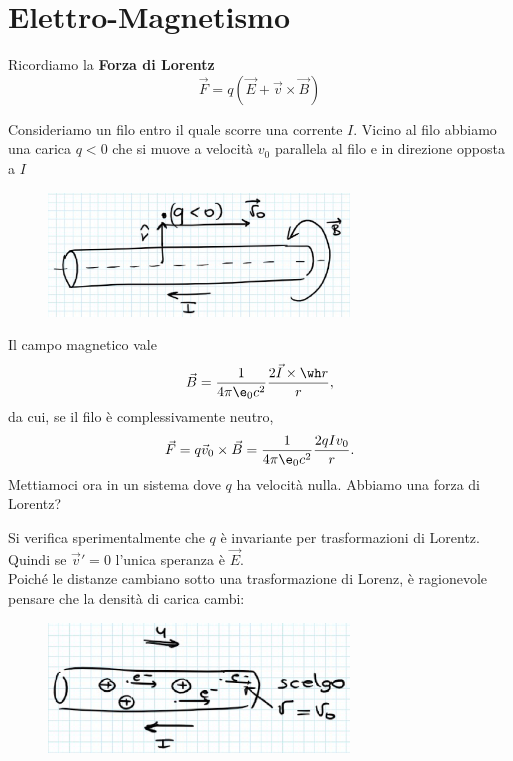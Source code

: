 \section{Elettro-Magnetismo}
Ricordiamo la \textbf{Forza di Lorentz}
\[\vec F=q(\vec E+\vec v\times \vec B)\]

\begin{example}
Consideriamo un filo entro il quale scorre una corrente $I$. Vicino al filo abbiamo una carica $q<0$ che si muove a velocit\`a $v_0$ parallela al filo e in direzione opposta a $I$

\begin{figure}[!htb]
    \centering
    \includegraphics[width=8cm]{images/Filo_e_carica.png}
\end{figure}

\noindent
Il campo magnetico vale
\[\vec B=\frac1{4\pi \e_0c^2}\frac{2 \vec I\times \wh r}r,\]
da cui, se il filo \`e complessivamente neutro,
\[\vec F=q\vec v_0\times \vec B=\frac1{4\pi \e_0c^2}\frac{2 qIv_0}r.\]
Mettiamoci ora in un sistema dove $q$ ha velocit\`a nulla. Abbiamo una forza di Lorentz?
\medskip

\noindent Si verifica sperimentalmente che $q$ \`e invariante per trasformazioni di Lorentz. Quindi se $\vec v'=0$ l'unica speranza \`e $\vec E$.\\
Poich\'e le distanze cambiano sotto una trasformazione di Lorenz, \`e ragionevole pensare che la densit\`a di carica cambi: 

\begin{figure}[!htb]
    \centering
    \includegraphics[width=8cm]{images/corrente_in_filo.png}
\end{figure}


\end{example}
